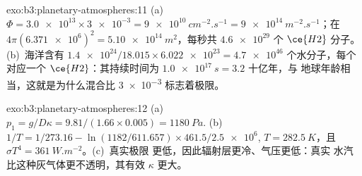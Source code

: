 \begin{solution}{exo:b3:planetary-atmospheres:11}
(a)~$\Phi = \num{3.0e13}\times\num{3e-3} = \qty{9e10}{cm^{-2}.s^{-1}} =
\qty{9e14}{m^{-2}.s^{-1}}$；在 $4\pi(\num{6.371e6})^2 =
\qty{5.10e14}{m^2}$，每秒共 $\num{4.6e29}$ 个 $\ce{H2}$ 分子。
(b)~海洋含有 $\num{1.4e24}/18.015\times\num{6.022e23} =
\num{4.7e46}$ 个水分子，每个对应一个 $\ce{H2}$：其持续时间为
$\qty{1.0e17}{s} = \num{3.2}\text{ 十亿年}$，与
地球年龄相当，这就是为什么混合比 \num{3e-3} 标志着极限。
\end{solution}

\begin{solution}{exo:b3:planetary-atmospheres:12}
(a)~$p_1 = g/D\kappa = 9.81/(1.66\times0.005) = \qty{1180}{Pa}$.
(b)~$1/T = 1/273.16 - \ln(1182/611.657)\times461.5/\num{2.5e6}$, $T =
\qty{282.5}{K}$，且 $\sigma T^4 = \qty{361}{W.m^{-2}}$。(c)~真实极限
更低，因此辐射层更冷、气压更低：真实
水汽比这种灰气体更不透明，其有效 $\kappa$
更大。
\end{solution}

